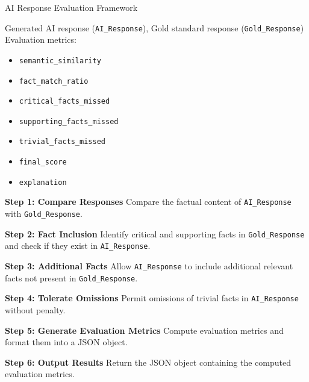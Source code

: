 \begin{algorithm}[!thb]\footnotesize
\caption{AI Response Evaluation Framework}
\label{alg:ai_response_evaluation}

\begin{algorithmic}
\Require Generated AI response (\texttt{AI\_Response}), Gold standard response (\texttt{Gold\_Response})
\Ensure Evaluation metrics:  
  \begin{itemize}
    \item \texttt{semantic\_similarity}
    \item \texttt{fact\_match\_ratio}
    \item \texttt{critical\_facts\_missed}
    \item \texttt{supporting\_facts\_missed}
    \item \texttt{trivial\_facts\_missed}
    \item \texttt{final\_score}
    \item \texttt{explanation}
  \end{itemize}

\State \textbf{Step 1: Compare Responses}  
    \State Compare the factual content of \texttt{AI\_Response} with \texttt{Gold\_Response}.

\State \textbf{Step 2: Fact Inclusion}  
    \State Identify critical and supporting facts in \texttt{Gold\_Response} and check if they exist in \texttt{AI\_Response}.

\State \textbf{Step 3: Additional Facts}  
    \State Allow \texttt{AI\_Response} to include additional relevant facts not present in \texttt{Gold\_Response}.

\State \textbf{Step 4: Tolerate Omissions}  
    \State Permit omissions of trivial facts in \texttt{AI\_Response} without penalty.

\State \textbf{Step 5: Generate Evaluation Metrics}  
    \State Compute evaluation metrics and format them into a JSON object.

\State \textbf{Step 6: Output Results}  
    \State Return the JSON object containing the computed evaluation metrics.

\end{algorithmic}
\end{algorithm}

